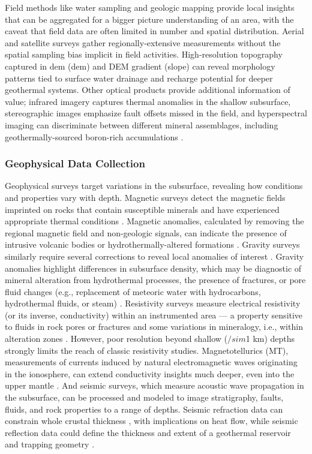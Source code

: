 Field methods like water sampling and geologic mapping provide local insights that can be aggregated for a bigger picture understanding of an area, with the caveat that field data are often limited in number and spatial distribution. Aerial and satellite surveys gather regionally-extensive measurements without the spatial sampling bias implicit in field activities. High-resolution topography captured in \acrlong{dem} (\acrshort{dem}) and DEM gradient (slope) can reveal morphology patterns tied to surface water drainage and recharge potential for deeper geothermal systems. Other optical products provide additional information of value; infrared imagery captures thermal anomalies in the shallow subsurface, stereographic images emphasize fault offsets missed in the field, and hyperspectral imaging can discriminate between different mineral assemblages, including geothermally-sourced boron-rich accumulations .

\subsubsection{Geophysical Data Collection}
Geophysical surveys target variations in the subsurface, revealing how conditions and properties vary with depth. Magnetic surveys detect the magnetic fields imprinted on rocks that contain susceptible minerals and have experienced appropriate thermal conditions \citep[p.\ 248-249]{lowrie_fundamentals_2007}. Magnetic anomalies, calculated by removing the regional magnetic field and non-geologic signals, can indicate the presence of intrusive volcanic bodies or hydrothermally-altered formations \citep[p.\ 146]{glassley_geothermal_2015}. Gravity surveys similarly require several corrections to reveal local anomalies of interest \citep[p.\ 59-62]{lowrie_fundamentals_2007}. Gravity anomalies highlight differences in subsurface density, which may be diagnostic of mineral alteration from hydrothermal processes, the presence of fractures, or pore fluid changes (e.g., replacement of meteoric water with hydrocarbons, hydrothermal fluids, or steam) \citep[p.\ 150]{glassley_geothermal_2015}. Resistivity surveys measure electrical resistivity (or its inverse, conductivity) within an instrumented area --– a property sensitive to fluids in rock pores or fractures and some variations in mineralogy, i.e., within alteration zones \citep[p.\ 147]{glassley_geothermal_2015}. However, poor resolution beyond shallow ($/sim$1 km) depths strongly limits the reach of classic resistivity studies. Magnetotellurics (MT), measurements of currents induced by natural electromagnetic waves originating in the ionosphere, can extend conductivity insights much deeper, even into the upper mantle \citep[p.\ 225]{lowrie_fundamentals_2007}. And seismic surveys, which measure acoustic wave propagation in the subsurface, can be processed and modeled to image stratigraphy, faults, fluids, and rock properties to a range of depths. Seismic refraction data can constrain whole crustal thickness \citep[e.g.][]{holmes_oceanic_2009}, with implications on heat flow, while seismic reflection data could define the thickness and extent of a geothermal reservoir and trapping geometry \citep[e.g.][]{cappetti_new_2005}.

